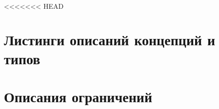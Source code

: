 <<<<<<< HEAD
\chapter{Листинги описаний концепций и типов} \label{AppendixA}





















\chapter{Описания ограничений} \label{AppendixB}







